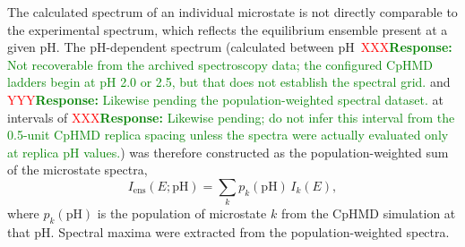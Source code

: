 The calculated spectrum of an individual microstate is not directly comparable to the experimental spectrum, which reflects the equilibrium ensemble present at a given pH.
The pH-dependent spectrum (calculated between pH~\textcolor{red}{XXX}\textcolor{green}{\textbf{Response:} Not recoverable from the archived spectroscopy data; the configured CpHMD ladders begin at pH 2.0 or 2.5, but that does not establish the spectral grid.} and \textcolor{red}{YYY}\textcolor{green}{\textbf{Response:} Likewise pending the population-weighted spectral dataset.} at intervals of \textcolor{red}{XXX}\textcolor{green}{\textbf{Response:} Likewise pending; do not infer this interval from the 0.5-unit CpHMD replica spacing unless the spectra were actually evaluated only at replica pH values.}) was therefore constructed as the population-weighted sum of the microstate spectra,
\begin{equation}
I_{\mathrm{ens}}(E;\mathrm{pH})
=
\sum_k p_k(\mathrm{pH})\, I_k(E),
\label{eq:ensemble-spectrum}
\end{equation}
where $p_k(\mathrm{pH})$ is the population of microstate $k$ from the CpHMD simulation at that pH.
Spectral maxima were extracted from the population-weighted spectra.
